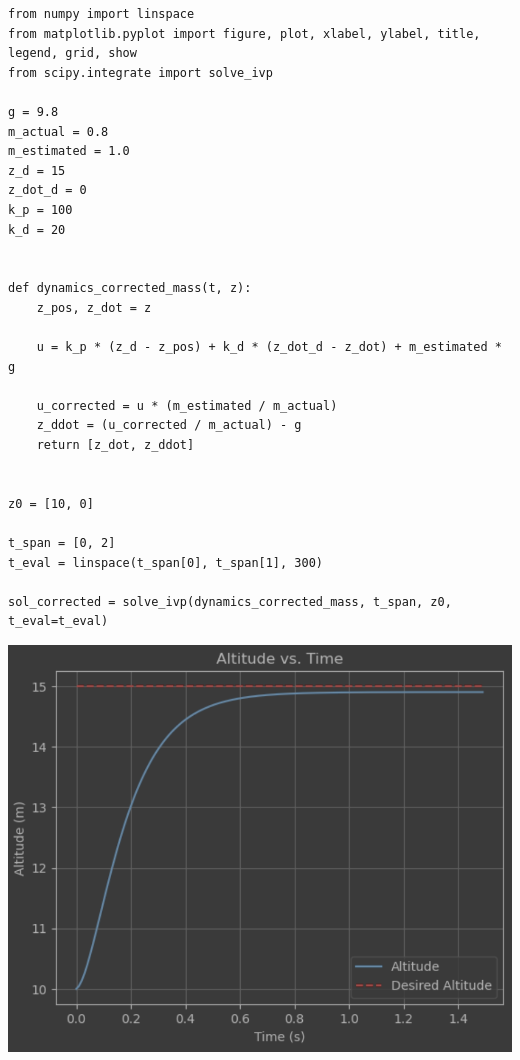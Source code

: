 \documentclass[letterpaper, 10 pt, conference]{ieeeconf}  %
\begin{document}
    \begin{lstlisting}[label={lst:lstlisting7}]
from numpy import linspace
from matplotlib.pyplot import figure, plot, xlabel, ylabel, title, legend, grid, show
from scipy.integrate import solve_ivp

g = 9.8
m_actual = 0.8
m_estimated = 1.0
z_d = 15
z_dot_d = 0
k_p = 100
k_d = 20


def dynamics_corrected_mass(t, z):
    z_pos, z_dot = z

    u = k_p * (z_d - z_pos) + k_d * (z_dot_d - z_dot) + m_estimated * g

    u_corrected = u * (m_estimated / m_actual)
    z_ddot = (u_corrected / m_actual) - g
    return [z_dot, z_ddot]


z0 = [10, 0]

t_span = [0, 2]
t_eval = linspace(t_span[0], t_span[1], 300)

sol_corrected = solve_ivp(dynamics_corrected_mass, t_span, z0, t_eval=t_eval)
    \end{lstlisting}

    \begin{center}
        \includegraphics[scale=0.4]{2-4}
    \end{center}
\end{document}
